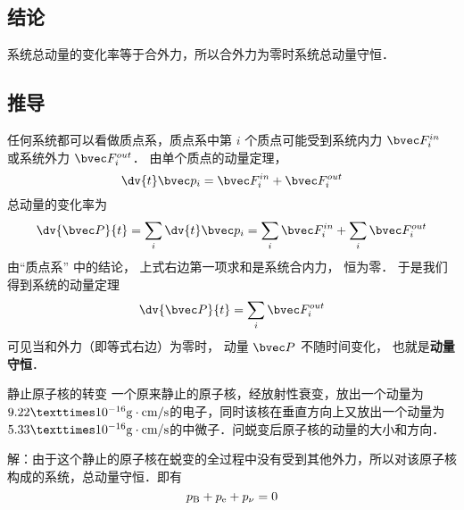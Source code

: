 \subsection{结论}
系统总动量的变化率等于合外力，所以合外力为零时系统总动量守恒．

\subsection{推导}
任何系统都可以看做质点系，质点系中第 $i$ 个质点可能受到系统内力 $\bvec F_i^{in}$ 或系统外力 $\bvec F_i^{out}$． 由单个质点的动量定理，
\begin{equation}
\dv{t} \bvec p_i = \bvec F_i^{in} + \bvec F_i^{out}
\end{equation}
总动量的变化率为
\begin{equation}
\dv{\bvec P}{t} = \sum_i \dv{t} \bvec p_i  = \sum_i \bvec F_i^{in}  + \sum_i \bvec F_i^{out}
\end{equation}
由“质点系” 中的结论， 上式右边第一项求和是系统合内力， 恒为零． 于是我们得到系统的动量定理
\begin{equation}
\dv{\bvec P}{t} = \sum_i \bvec F_i^{out}
\end{equation}
可见当和外力（即等式右边）为零时， 动量 $\bvec P$ 不随时间变化， 也就是\textbf{动量守恒}．

\begin{example}{静止原子核的转变}
一个原来静止的原子核，经放射性衰变，放出一个动量为$9.22×10^{-16}{\rm g\cdot cm/s}$的电子，同时该核在垂直方向上又放出一个动量为$5.33×10^{-16}{\rm g\cdot cm/s}$的中微子．问蜕变后原子核的动量的大小和方向．

解：由于这个静止的原子核在蜕变的全过程中没有受到其他外力，所以对该原子核构成的系统，总动量守恒．即有
$$p_{\rm B}+p_{\rm e}+p_{\rm \nu}=0$$

\end{example}
